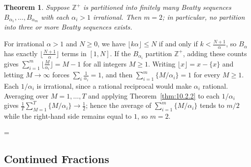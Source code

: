 \documentclass[11pt]{article}
\makeatletter
\theoremstyle{ntstyle}
\newtheorem{theorem}{Theorem}[subsection]
\let\nt@closedisplay\]
\def\nt@guardedclose{\@ifnextchar\par{\nt@closeafterpar}{\@ifnextchar\end{\postdisplaypenalty\@M\nt@closedisplay}{\nt@closedisplay}}}
\def\nt@closeafterpar\par{\@ifnextchar\par{\nt@closeafterpar}{\@ifnextchar\end{\postdisplaypenalty\@M\nt@closedisplay\par}{\nt@closedisplay\par}}}
\renewenvironment{proof}[1][\proofname]{\par
  \pushQED{\qed}\normalfont\topsep\medskipamount\edef\nt@afterproof{\@endparpenalty=\the\@endparpenalty\relax}\@beginparpenalty\@M\@endparpenalty\@M\let\]\nt@guardedclose\trivlist\item[]\textit{#1\@addpunct{.}} \ignorespaces}{\ifvmode\addpenalty\@M\fi\popQED\nt@afterproof\endtrivlist\@endpefalse}
\makeatother
\begin{document}
\begin{theorem}\label{thm:10.2.3} Suppose $\mathbb{Z}^+$
	is partitioned into finitely many Beatty sequences
	$B_{\alpha_1},\ldots,B_{\alpha_m}$ with each $\alpha_i>1$ irrational.
	Then $m=2$; in particular, no partition into three or more Beatty
	sequences exists.

\end{theorem}

\begin{proof} For irrational $\alpha>1$ and $N\ge0$,
	we have $\lfloor k\alpha\rfloor\le N$ if and only if $k<\tfrac{N+1}{\alpha}$, so
	$B_\alpha$ has exactly $\big\lfloor\tfrac{N+1}{\alpha}\big\rfloor$
	terms in $[1,N]$. If the $B_{\alpha_i}$ partition $\mathbb{Z}^+$,
	adding these counts gives
	$\sum_{i=1}^{m}\big\lfloor\tfrac{M}{\alpha_i}\big\rfloor=M-1$ for all
	integers $M\ge1$. Writing $\lfloor x\rfloor=x-\{x\}$ and letting
	$M\to\infty$ forces $\sum_i\tfrac{1}{\alpha_i}=1$, and then
	$\sum_{i=1}^{m}\{M/\alpha_i\}=1$ for every $M\ge1$. Each $1/\alpha_i$ is irrational, since a rational reciprocal would make $\alpha_i$ rational. Averaging over $M=1,\ldots,T$ and applying Theorem~\ref{thm:10.2.2} to each $1/\alpha_i$ gives $\tfrac{1}{T}\sum_{M=1}^{T}\{M/\alpha_i\}\to\tfrac{1}{2}$;
	hence the average of $\sum_{i=1}^{m}\{M/\alpha_i\}$ tends to $m/2$ while the right-hand side
	remains equal to $1$, so $m=2$.

\end{proof}
\subsection{Continued Fractions}
\end{document}
